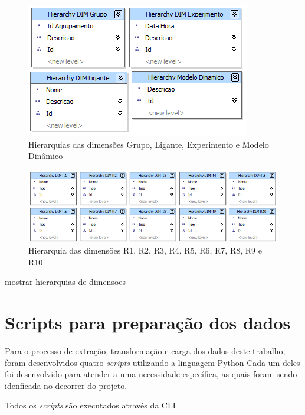 \begin{itemize}
\begin{figure}[h]
        \center
        \includegraphics[scale=0.6]{images/Hierar_Grupo_Ligante_Experimento_Modelo.png}
        \caption{Hierarquias das dimensões Grupo, Ligante, Experimento e Modelo Dinâmico}
        \label{fig:hierarGrupoLiganteExperimentoModelo}
\end{figure}

\begin{figure}[h]
        \center
        \includegraphics[scale=0.6]{images/Hierar_DIMR1_ate_10.png}
        \caption{Hierarquia das dimensões R1, R2, R3, R4, R5, R6, R7, R8, R9 e R10}
        \label{fig:HierarR1ateR10}
\end{figure}

mostrar hierarquias de dimensoes
	




\section{Scripts para preparação dos dados}
\label{sec:ScriptsParaPreparacaoDosDados}

Para o processo de extração, transformação e carga dos dados deste trabalho, foram desenvolvidos quatro \emph{scripts} utilizando a linguagem Python Cada um deles foi desenvolvido para atender a uma necessidade específica, as quais foram sendo idenficada no decorrer do projeto.

Todos os \emph{scripts} são executados através da CLI



\end{itemize}

